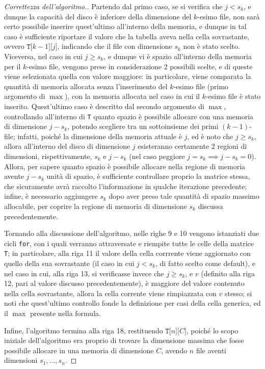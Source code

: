 \documentclass[a4paper, 12pt]{report}
\begin{document}
\begin{proof}[Correttezza dell'algoritmo.]
        Partendo dal primo caso, se si verifica che $j < s_k$, e dunque la capacità del disco è inferiore della dimensione del $k$-esimo file, non sarà certo possibile inserire quest'ultimo all'interno della memoria, e dunque in tal caso è sufficiente riportare il valore che la tabella aveva nella cella sovrastante, ovvero $\texttt{T[}k-1\texttt{][}j\texttt{]}$, indicando che il file con dimensione $s_k$ non è stato scelto. Viceversa, nel caso in cui $j \ge s_k$, e dunque vi è spazio all'interno della memoria per il $k$-esimo file, vengono prese in considerazione 2 possibili scelte, e di queste viene selezionata quella con valore maggiore: in particolare, viene comparata la quantità di memoria allocata senza l'inserimento del $k$-esimo file (primo argomento di $\max$), con la memoria allocata nel caso in cui il $k$-esimo file è stato inserito. Quest'ultimo caso è descritto dal secondo argomento di $\max$, controllando all'interno di \texttt{T} quanto spazio è possibile allocare con una memoria di dimensione $j - s_k$, potendo scegliere tra un sottoinsieme dei primi $(k - 1)$-file; infatti, poiché la dimensione della memoria attuale è $j$, ed è noto che $j \ge s_k$, allora all'interno del disco di dimensione $j$ esisteranno certamente 2 regioni di dimensioni, rispettivamente, $s_k$ e $j - s_k$ (nel caso peggiore $j = s_k \implies j - s_k = 0$). Allora, per sapere quanto spazio è possibile allocare nella regione di memoria avente $j - s_k$ unità di spazio, è sufficiente controllare proprio la matrice stessa, che sicuramente avrà raccolto l'informazione in qualche iterazione precedente; infine, è necessario aggiungere $s_k$ dopo aver preso tale quantità di spazio massimo allocabile, per coprire la regione di memoria di dimensione $s_k$ discussa precedentemente.

        Tornando alla discussione dell'algoritmo, nelle righe 9 e 10 vengono istanziati due cicli \texttt{for}, con i quali verranno attraversate e riempite tutte le celle della matrice \texttt{T}; in particolare, alla riga 11 il valore della cella corrrente viene aggiornato con quello della sua sovrastante (il caso in cui $j < s_k$, di fatto scelto come default), e nel caso in cui, alla riga 13, si verificasse invece che $j \ge s_k$, e $v$ (definito alla riga 12, pari al valore discusso precedentemente), è maggiore del valore contenuto nella cella sovrastante, allora la cella corrente viene rimpiazzata con $v$ stesso; si noti che quest'ultimo controllo fonde la definizione per casi della cella generica, ed il $\max$ presente nella formula.

        Infine, l'algoritmo termina alla riga 18, restituendo $\texttt{T[}n\texttt{][}C\texttt{]}$, poiché lo scopo iniziale dell'algoritmo era proprio di trovare la dimensione massima che fosse possibile allocare in una memoria di dimensione $C$, avendo $n$ file aventi dimensioni $s_1, \ldots, s_n$.
    \end{proof}
\end{document}
